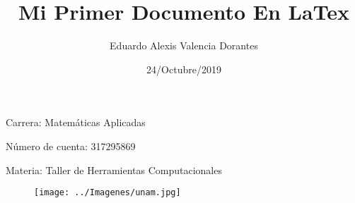 \documentclass{article}%
\title{Mi Primer Documento En LaTex}
\author{Eduardo Alexis Valencia Dorantes}
\date{24/Octubre/2019}
\begin{document}
	\begin{titlepage}
		\maketitle
	\end{titlepage}

Carrera: Matemáticas Aplicadas

Número de cuenta: 317295869

Materia: Taller de Herramientas Computacionales
\vfill

\begin{figure}[h]
	\centering
	\texttt{[image: ../Imagenes/unam.jpg]}
	\caption{}
	\label{fig:p1}
\end{figure}
\end{document}
